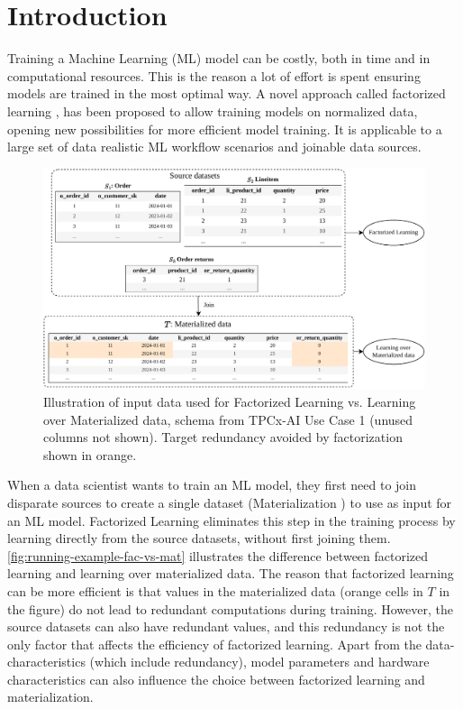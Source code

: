 
\chapter{Introduction}
\label{chapter:introduction}

Training a Machine Learning (ML) model can be costly, both in time and in computational resources. This is the reason a lot of effort is spent ensuring models are trained in the most optimal way. A novel approach called factorized learning \cite{orion_learning_gen_lin_models}, has been proposed to allow training models on normalized data, opening new possibilities for more efficient model training. It is applicable to a large set of data realistic ML workflow scenarios and joinable data sources.
\begin{figure}[h]
    \centering
    \includegraphics[width=0.95\linewidth]{chapters/01_introduction/figures/running-example-intro.pdf}
    \caption{Illustration of input data used for Factorized Learning vs. Learning over Materialized data, schema from TPCx-AI \cite{tpcx_ai} Use Case 1 (unused columns not shown). Target redundancy avoided by factorization shown in orange.}
    \label{fig:running-example-fac-vs-mat}
\end{figure}

When a data scientist wants to train an ML model, they first need to join disparate sources to create a single dataset (Materialization \cite{rel_db_glossary}) to use as input for an ML model. Factorized Learning eliminates this step in the training process by learning directly from the source datasets, without first joining them. \autoref{fig:running-example-fac-vs-mat} illustrates the difference between factorized learning and learning over materialized data. The reason that factorized learning can be more efficient is that values in the materialized data (orange cells in $T$ in the figure) do not lead to redundant computations during training. However, the source datasets can also have redundant values, and this redundancy is not the only factor that affects the efficiency of factorized learning. Apart from the data-characteristics (which include redundancy), model parameters and hardware characteristics can also influence the choice between factorized learning and materialization.

